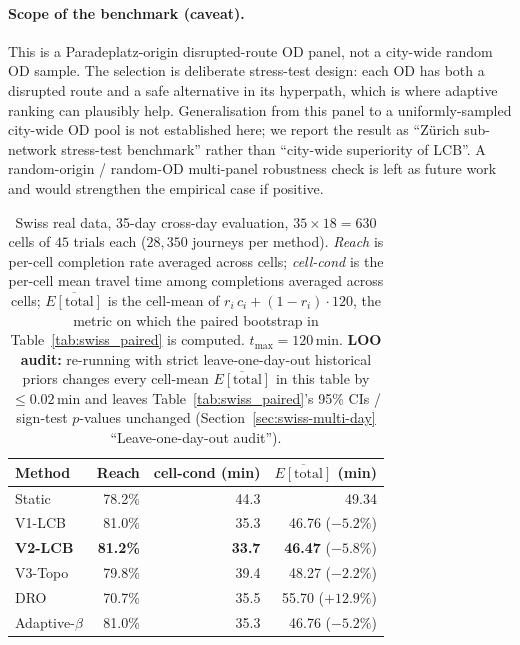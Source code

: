 \documentclass[11pt]{article}
\theoremstyle{definition}
\theoremstyle{remark}
\begin{document}
\paragraph{Scope of the benchmark (caveat).} This is a Paradeplatz-origin
disrupted-route OD panel, not a city-wide random OD sample. The
selection is deliberate stress-test design: each OD has both a
disrupted route and a safe alternative in its hyperpath, which is
where adaptive ranking can plausibly help. Generalisation from this
panel to a uniformly-sampled city-wide OD pool is not established
here; we report the result as ``Z\"urich sub-network stress-test
benchmark'' rather than ``city-wide superiority of LCB''. A
random-origin / random-OD multi-panel robustness check is left as
future work and would strengthen the empirical case if positive.

\begin{table}[!t]
\centering
\caption{Swiss real data, 35-day cross-day evaluation, $35{\times}18{=}630$
cells of $45$ trials each ($28{,}350$ journeys per method). \emph{Reach}
is per-cell completion rate averaged across cells; \emph{cell-cond} is
the per-cell mean travel time among completions averaged across cells;
$\overline{E[\mathrm{total}]}$ is the cell-mean of
$r_i\,c_i + (1-r_i)\cdot 120$, the metric on which the paired bootstrap
in Table~\ref{tab:swiss_paired} is computed. $t_{\max}{=}120$\,min.
\textbf{LOO audit:} re-running with strict leave-one-day-out
historical priors changes every cell-mean
$\overline{E[\mathrm{total}]}$ in this table by $\leq 0.02$\,min and
leaves Table~\ref{tab:swiss_paired}'s 95\% CIs / sign-test $p$-values
unchanged (Section~\ref{sec:swiss-multi-day} ``Leave-one-day-out
audit'').}
\label{tab:swiss_multi}
\begin{tabular}{l rrr}
\toprule
Method        & Reach & cell-cond (min) & $\overline{E[\mathrm{total}]}$ (min) \\
\midrule
Static            & 78.2\% & 44.3 & 49.34 \\
V1-LCB            & 81.0\% & 35.3 & 46.76 ($-5.2\%$) \\
\textbf{V2-LCB}   & \textbf{81.2\%} & \textbf{33.7} & \textbf{46.47} ($\bm{-5.8\%}$) \\
V3-Topo           & 79.8\% & 39.4 & 48.27 ($-2.2\%$) \\
DRO               & 70.7\% & 35.5 & 55.70 ($+12.9\%$) \\
Adaptive-$\beta$  & 81.0\% & 35.3 & 46.76 ($-5.2\%$) \\
\bottomrule
\end{tabular}
\end{table}
\end{document}
